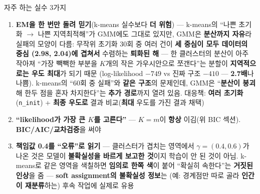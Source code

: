\begin{frame}{자주 하는 실수 3가지}
  \small
  \begin{enumerate}
    \item \textbf{EM을 한 번만 돌려 믿기}(k-means 실수보다
      \textbf{더 위험}) --- k-means의 ``나쁜 초기화 $\to$
      나쁜 지역최적해''가 GMM에도 그대로 있지만, GMM은
      \textbf{분산까지 자유}라 실패의 모양이 다름: 무작위
      초기화 30회 중 여러 건이 \textbf{세 중심이 모두 데이터의
      중심 (2.98, 2.04)에 겹쳐서} 수렴하는 \textbf{퇴화된 해}
      --- 한 클러스터의 분산이 아주 작아져 ``가장 빽빽한 부분을
      $K$개의 작은 가우시안으로 쪼갠다''는 분할이
      \textbf{지역적으로는 우도 최대}가 되기 때문
      (log-likelihood $-749$ vs 진짜 구조 $-410$ ---
      \textbf{2.7배}나 나쁨). k-means의
      ``60회 중 실패''와 \textbf{같은 구조}의 문제인데, GMM은
      ``\textbf{분산이 붕괴}해 한두 점을 혼자 차지한다''는
      \textbf{추가 경로}까지 열려 있음. 대응책: \textbf{여러
      초기화}(\texttt{n\_init}) + \textbf{최종 우도로} 결과
      비교(\textbf{최대} 우도를 가진 결과 채택)
    \item \textbf{``likelihood가 가장 큰 $K$를 고른다''} ---
      $K = m$이 \textbf{항상} 이김(위 BIC 섹션).
      \textbf{BIC/AIC/교차검증}을 써야
    \item \textbf{책임값 0.4를 ``오류''로 읽기} ---
      클러스터가 겹치는 영역에서 $\gamma = (0.4, 0.6)$가
      나온 것은 모델이 \textbf{불확실성을 바르게 보고한
      것}이지 학습이 안 된 것이 아님. k-means로 같은 영역을
      색칠하면 \textbf{임의로 한쪽 색}이 붙어 ``확실히
      속한다''는 \textbf{거짓된 인상}을 줌 ---
      \textbf{soft assignment의 불확실성 정보}는
      (예: 경계점만 따로 골라 \textbf{인간이 재분류}하는)
      후속 작업에 실제로 유용
  \end{enumerate}
\end{frame}
